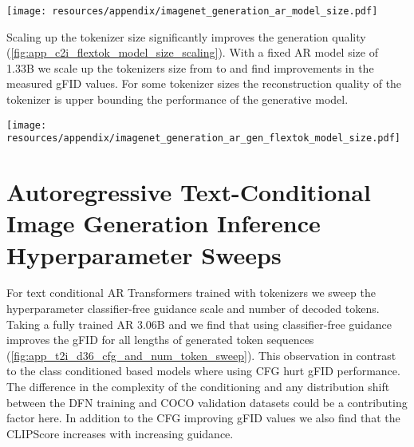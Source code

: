\begin{figure*}[h]
\centering
\texttt{[image: resources/appendix/imagenet\_generation\_ar\_model\_size.pdf]}
\caption{
\textbf{Autoregressive class-conditional image generation model scaling.} Left shows the gFID values for each model size at varying numbers of generated tokens. The right figure shows the gFID with 256 tokens against the parameter count of the AR model. The gFID values are measured with respect to the full ImageNet-1k train set statistics. All AR models are trained using the \oursxlarge tokenizer trained on ImageNet-1k. During generation we use the optimal inference parameters detailed in \cref{sec:app_c2i_hyper_params}.
}
\label{fig:app_c2i_ar_model_size_scaling}
\end{figure*}

Scaling up the tokenizer size significantly improves the generation quality (\cref{fig:app_c2i_flextok_model_size_scaling}). With a fixed AR model size of 1.33B we scale up the tokenizers size from \oursbase to \oursxlarge and find improvements in the measured gFID values. For some tokenizer sizes the reconstruction quality of the tokenizer is upper bounding the performance of the generative model.

\begin{figure*}[h]
\centering
\texttt{[image: resources/appendix/imagenet\_generation\_ar\_gen\_flextok\_model\_size.pdf]}
\caption{
\textbf{Autoregressive class-conditional image generation \ours tokenizer scaling.} Left shows the gFID values for 1.33B AR models trained with each of the different sized \ours tokeninizers at varying numbers of generated tokens. The right figure shows the gFID with 256 tokens against the parameter in the \ours tokenizer. The gFID values are measured with respect to the full ImageNet-1k train set statistics. During generation we use the optimal inference parameters detailed in \cref{sec:app_c2i_hyper_params}.
}
\label{fig:app_c2i_flextok_model_size_scaling}
\end{figure*}

 
\clearpage
\section{Autoregressive Text-Conditional Image Generation Inference Hyperparameter Sweeps}
\label{sec:app_t2i_inference_hparam_sweeps}

For text conditional AR Transformers trained with \ours tokenizers we sweep the hyperparameter classifier-free guidance scale and number of decoded tokens. Taking a fully trained AR 3.06B and \oursxlarge we find that using classifier-free guidance improves the gFID for all lengths of generated token sequences (\cref{fig:app_t2i_d36_cfg_and_num_token_sweep}). This observation in contrast to the class conditioned \ours based models where using CFG hurt gFID performance. The difference in the complexity of the conditioning and any distribution shift between the DFN training and COCO validation datasets could be a contributing factor here. In addition to the CFG improving gFID values we also find that the CLIPScore increases with increasing guidance. 

